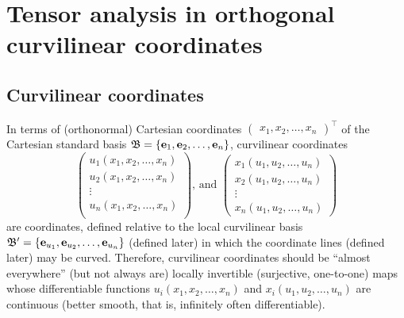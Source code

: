 

\section{Tensor analysis in orthogonal curvilinear coordinates}

\subsection{Curvilinear coordinates}
In terms of (orthonormal) Cartesian coordinates $\begin{pmatrix}x_1, x_2,\ldots , x_n\end{pmatrix}^\intercal$
of the Cartesian standard basis ${\frak B}=\left\{ {\bf e}_1, {\bf e}_2,\ldots ,{\bf e}_n \right\}$,
curvilinear coordinates
\begin{equation}
\begin{pmatrix}  u_1(x_1, x_2,\ldots ,x_n)\\
 u_2(x_1, x_2,\ldots ,x_n)\\
\vdots \\
 u_n(x_1, x_2,\ldots ,x_n)\\
\end{pmatrix}
\text{, and }
\begin{pmatrix}
x_1(u_1, u_2,\ldots ,u_n)\\
x_2(u_1, u_2,\ldots ,u_n)\\
\vdots \\
 x_n(u_1, u_2,\ldots ,u_n)
\end{pmatrix}
\label{2018-mm-ch-ten-cc}
\end{equation}
are coordinates, defined relative to the local curvilinear basis
${\frak B}'=\left\{ {\bf e}_{u_1}, {\bf e}_{u_2},\ldots ,{\bf e}_{u_n} \right\}$
(defined later)
in which the coordinate lines (defined later) may be curved.
Therefore, curvilinear coordinates should be ``almost everywhere'' (but not always are)
locally invertible (surjective, one-to-one) maps whose differentiable functions
$u_i(x_1, x_2,\ldots ,x_n)$ and $x_i(u_1, u_2,\ldots ,u_n)$
are continuous (better smooth, that is, infinitely often differentiable).
